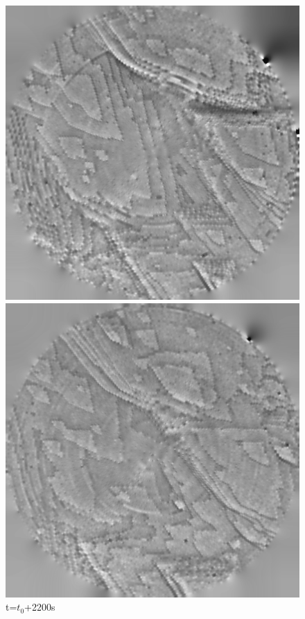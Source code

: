 \begin{figure}[!ht]
\centering
{}
  	\includegraphics[width=\linewidth]{images/006_X10s50l10m_MOv2_457.png}
    \caption*{t=$t_0$+2200s} 
\endminipage\hfill
{}
  	\includegraphics[width=\linewidth]{images/006_X10s50l10m_MOv2_698.png}

\end{figure}
